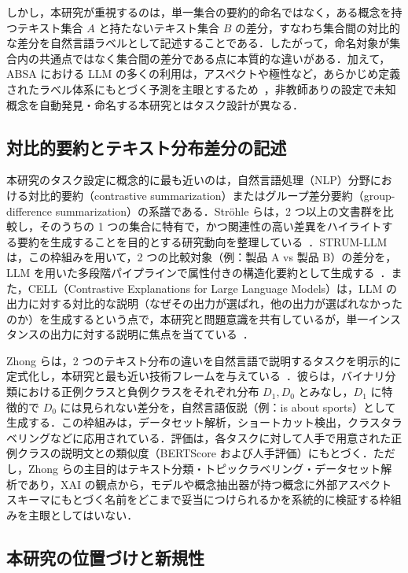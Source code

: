 しかし，本研究が重視するのは，単一集合の要約的命名ではなく，ある概念を持つテキスト集合 $A$ と持たないテキスト集合 $B$ の差分，すなわち集合間の対比的な差分を自然言語ラベルとして記述することである．したがって，命名対象が集合内の共通点ではなく集合間の差分である点に本質的な違いがある．加えて，ABSA における LLM の多くの利用は，アスペクトや極性など，あらかじめ定義されたラベル体系にもとづく予測を主眼とするため~\cite{simmering2023llmabsa}，非教師ありの設定で未知概念を自動発見・命名する本研究とはタスク設計が異なる．

\subsection{対比的要約とテキスト分布差分の記述}

本研究のタスク設定に概念的に最も近いのは，自然言語処理（NLP）分野における対比的要約（contrastive summarization）またはグループ差分要約（group-difference summarization）の系譜である．Str{\"o}hle らは，2 つ以上の文書群を比較し，そのうちの 1 つの集合に特有で，かつ関連性の高い差異をハイライトする要約を生成することを目的とする研究動向を整理している~\cite{strohle2024contrastive}．STRUM-LLM は，この枠組みを用いて，2 つの比較対象（例：製品 A vs 製品 B）の差分を，LLM を用いた多段階パイプラインで属性付きの構造化要約として生成する~\cite{saha2024strumllm}．また，CELL（Contrastive Explanations for Large Language Models）は，LLM の出力に対する対比的な説明（なぜその出力が選ばれ，他の出力が選ばれなかったのか）を生成するという点で，本研究と問題意識を共有しているが，単一インスタンスの出力に対する説明に焦点を当てている~\cite{luss2024cell}．

Zhong らは，2 つのテキスト分布の違いを自然言語で説明するタスクを明示的に定式化し，本研究と最も近い技術フレームを与えている~\cite{zhong2022describing}．彼らは，バイナリ分類における正例クラスと負例クラスをそれぞれ分布 $D_1, D_0$ とみなし，$D_1$ に特徴的で $D_0$ には見られない差分を，自然言語仮説（例：is about sports）として生成する．この枠組みは，データセット解析，ショートカット検出，クラスタラベリングなどに応用されている．評価は，各タスクに対して人手で用意された正例クラスの説明文との類似度（BERTScore および人手評価）にもとづく．ただし，Zhong らの主目的はテキスト分類・トピックラベリング・データセット解析であり，XAI の観点から，モデルや概念抽出器が持つ概念に外部アスペクトスキーマにもとづく名前をどこまで妥当につけられるかを系統的に検証する枠組みを主眼としてはいない．

\subsection{本研究の位置づけと新規性}

